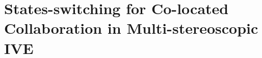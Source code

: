 \chapter{States-switching for Co-located Collaboration in Multi-stereoscopic IVE}
\label{chapter:switch}
